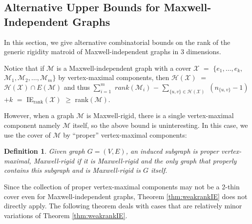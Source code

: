 \documentclass[10pt]{article}
\def\M{\mathcal {M}}
\def\H{\mathcal {H}}
\def\X{\mathcal {X}}
\newtheorem{dfn}{Definition}
\begin{document}
\subsection{Alternative Upper Bounds for Maxwell-Independent Graphs}\label{sec:proper}
In this section, we give alternative combinatorial bounds on the rank of the generic rigidity matroid of Maxwell-independent graphs in $3$ dimensions.


Notice that if $\M$ is a Maxwell-independent graph with a cover $\X$ $=$ $\{e_1, \ldots, e_k,$ $\M_1, \M_2, \ldots, \M_m\}$ by vertex-maximal components, then $\H(\X)$ $=$ $\H(\X) \cap E(\M)$ and thus $\sum_{i=1}^m$ $rank(\M_i)$ $-$ $\sum_{{\{u, v\}} \in \H(\X)}$ $(n_{\{u, v\}} -1)$ $+k$ $=$ IE$_\text{rank}(\X)$ $\ge$ rank$(\M)$.


However, when a graph $\M$ is Maxwell-rigid, there is a single vertex-maximal component namely $\M$ itself, so the above bound is uninteresting. In this case, we use the cover of $\M$ by ``proper'' vertex-maximal components:

\begin{dfn}\label{dfn:properMax}
Given graph $G=(V, E)$, an induced subgraph is \emph{proper vertex-maximal, Maxwell-rigid} if it is Maxwell-rigid and the only graph that properly contains this
subgraph and is Maxwell-rigid is $G$ itself.
\end{dfn}

\noindent Since the collection of proper vertex-maximal components may not be a 2-thin cover even for Maxwell-independent graphs, Theorem \ref{thm:weakrankIE} does not directly apply. The following theorem deals with cases that are relatively minor variations of Theorem \ref{thm:weakrankIE}.
\end{document}
